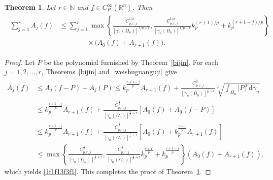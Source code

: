 \documentclass[12pt]{article}
\theoremstyle{plain}
\newtheorem{theorem}{Theorem}[section]
\theoremstyle{definition}
\theoremstyle{remark}
\numberwithin{equation}{section}
\begin{document}
\begin{theorem}\label{zyao}
Let $r\in\mathbb{N}$ and $f\in C_P^{\infty}(\mathbb{R}^{n})$. Then
	\begin{eqnarray}
\begin{aligned}
\sum_{j=1}^{r}A_j(f)
&\leqslant
\sum_{j=1}^{r}
\max\left\{
\frac{C_{p,r,j}^{1/p}}{[\gamma_n(\Omega_n)]^{1/p+r}},
\frac{C_{p,r,j}^{1/p}}{[\gamma_n(\Omega_n)]^{1/p+r}}k_p^{(r+1)/p}
+k_p^{(r+1-j)/p}
\right\}\\
&\qquad\qquad\times\bigl(A_0(f)+A_{r+1}(f)\bigr).
\end{aligned}
\label{1f1f13f3f1}
\end{eqnarray}
\end{theorem}
\begin{proof}
Let $P$ be the polynomial furnished by Theorem~\ref{bijin}.  For each $j=1,2,\ldots,r$, Theorems~\ref{bijin} and~\ref{weishuguanguji} give
	$$\begin{aligned}A_{j}\left( f \right)&\leqslant A_{j}\left( f-P \right) +A_{j}\left( P \right) \leqslant k_{p}^{\frac{r+1-j}{p}}A_{r+1}\left( f \right) +\frac{C_{p,r,j}^{\frac{1}{p}}}{[\gamma_n(\Omega_n)]^{\frac{1}{p}+r}} \sqrt[p]{\int_{\Omega_{n}} \left| P \right|^{p} \mathrm{d} \gamma_{n}}\\ &\leqslant k_{p}^{\frac{r+1-j}{p}}A_{r+1}\left( f \right) +\frac{C_{p,r,j}^{\frac{1}{p}}}{[\gamma_n(\Omega_n)]^{\frac{1}{p}+r}} \left[ A_{0}\left( f \right) +A_{0}\left( f-P \right) \right]\\ &\leqslant k_{p}^{\frac{r+1-j}{p}}A_{r+1}\left( f \right) +\frac{C_{p,r,j}^{\frac{1}{p}}}{[\gamma_n(\Omega_n)]^{\frac{1}{p}+r}} \left[ A_{0}\left( f \right) +k_{p}^{\frac{r+1}{p}}A_{r+1}\left( f \right) \right]\\ &\leqslant \max \left\{ \frac{C_{p,r,j}^{\frac{1}{p}}}{[\gamma_n(\Omega_n)]^{\frac{1}{p}+r}} ,\frac{C_{p,r,j}^{\frac{1}{p}}}{[\gamma_n(\Omega_n)]^{\frac{1}{p}+r}} k_{p}^{\frac{r+1}{p}}+k_{p}^{\frac{r+1-j}{p}} \right\} \left( A_{0}\left( f \right) +A_{r+1}\left( f \right) \right) ,\end{aligned}$$
	which yields \eqref{1f1f13f3f1}. This completes the proof of Theorem~\ref{zyao}.
\end{proof}
\end{document}
